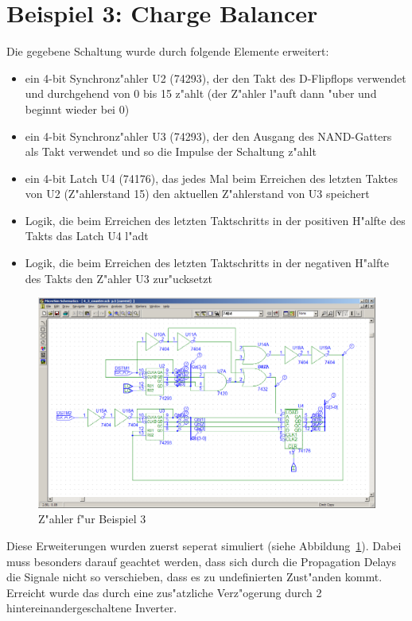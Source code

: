 \section{Beispiel 3: Charge Balancer}

Die gegebene Schaltung wurde durch folgende Elemente erweitert:

\begin{itemize}
 \item ein 4-bit Synchronz"ahler U2 (74293), der den Takt des D-Flipflops verwendet und durchgehend von 0 bis 15 z"ahlt (der Z"ahler l"auft dann "uber und beginnt wieder bei 0)
 \item ein 4-bit Synchronz"ahler U3 (74293), der den Ausgang des NAND-Gatters als Takt verwendet und so die Impulse der Schaltung z"ahlt
 \item ein 4-bit Latch U4 (74176), das jedes Mal beim Erreichen des letzten Taktes von U2 (Z"ahlerstand 15) den aktuellen Z"ahlerstand von U3 speichert
 \item Logik, die beim Erreichen des letzten Taktschritts in der positiven H"alfte des Takts das Latch U4 l"adt
 \item Logik, die beim Erreichen des letzten Taktschritts in der negativen H"alfte des Takts den Z"ahler U3 zur"ucksetzt
\end{itemize}

\begin{figure}[ht]
 \centering
 \includegraphics[width=\textwidth]{./img/4_3_counter_schem.PNG}
 \caption{Z"ahler f"ur Beispiel 3}
 \label{fig:4_3_counter_schem}
\end{figure}


Diese Erweiterungen wurden zuerst seperat simuliert (siehe Abbildung~\ref{fig:4_3_counter_schem}). Dabei muss besonders darauf geachtet werden, dass sich durch die Propagation Delays die Signale nicht so verschieben, dass es zu undefinierten Zust"anden kommt. Erreicht wurde das durch eine zus"atzliche Verz"ogerung durch 2 hintereinandergeschaltene Inverter.

